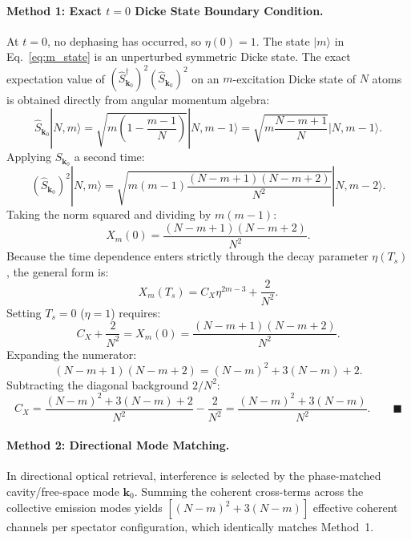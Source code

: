 \documentclass[11pt,a4paper]{article}
\begin{document}
\paragraph{Method 1: Exact $t = 0$ Dicke State Boundary Condition.}
At $t = 0$, no dephasing has occurred, so $\eta(0) = 1$. The state $|m\rangle$ in Eq.~\eqref{eq:m_state} is an unperturbed symmetric Dicke state. The exact expectation value of $(\hat{S}_{\mathbf{k}_0}^\dagger)^2 (\hat{S}_{\mathbf{k}_0})^2$ on an $m$-excitation Dicke state of $N$ atoms is obtained directly from angular momentum algebra:
\begin{equation}
    \hat{S}_{\mathbf{k}_0} |N, m\rangle = \sqrt{m \left( 1 - \frac{m - 1}{N} \right)} |N, m - 1\rangle = \sqrt{m \frac{N - m + 1}{N}} |N, m - 1\rangle.
\end{equation}
Applying $\hat{S}_{\mathbf{k}_0}$ a second time:
\begin{equation}
    (\hat{S}_{\mathbf{k}_0})^2 |N, m\rangle = \sqrt{m(m - 1) \frac{(N - m + 1)(N - m + 2)}{N^2}} |N, m - 2\rangle.
\end{equation}
Taking the norm squared and dividing by $m(m - 1)$:
\begin{equation}
    X_m(0) = \frac{(N - m + 1)(N - m + 2)}{N^2}.
    \label{eq:Xm_0_exact}
\end{equation}
Because the time dependence enters strictly through the decay parameter $\eta(T_s)$, the general form is:
\begin{equation}
    X_m(T_s) = C_X \eta^{2m - 3} + \frac{2}{N^2}.
\end{equation}
Setting $T_s = 0$ ($\eta = 1$) requires:
\begin{equation}
    C_X + \frac{2}{N^2} = X_m(0) = \frac{(N - m + 1)(N - m + 2)}{N^2}.
\end{equation}
Expanding the numerator:
\begin{equation}
    (N - m + 1)(N - m + 2) = (N - m)^2 + 3(N - m) + 2.
\end{equation}
Subtracting the diagonal background $2 / N^2$:
\begin{equation}
    C_X = \frac{(N - m)^2 + 3(N - m) + 2}{N^2} - \frac{2}{N^2} = \frac{(N - m)^2 + 3(N - m)}{N^2}. \qquad \blacksquare
\end{equation}

\paragraph{Method 2: Directional Mode Matching.}
In directional optical retrieval, interference is selected by the phase-matched cavity/free-space mode $\mathbf{k}_0$. Summing the coherent cross-terms across the collective emission modes yields $[(N - m)^2 + 3(N - m)]$ effective coherent channels per spectator configuration, which identically matches Method~1.
\end{document}
